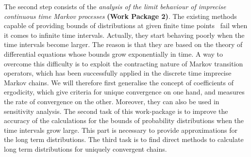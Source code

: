 \documentclass[11pt,dvipsnames,usenames,a4paper]{article}
\begin{document}

The second step consists of the \emph{analysis of the limit behaviour of imprecise continuous time Markov processes} {\bf(Work Package 2)}. The existing methods capable of providing bounds of distributions at given finite time points~\cite{Skulj2015} fail when it comes to infinite time intervals. Actually, they start behaving poorly when the time intervals become larger. The reason is that they are based on the theory of differential equations whose bounds grow exponentially in time. A way to overcome this difficulty is to exploit the contracting nature of Markov transition operators, which has been successfully applied in the discrete time imprecise Markov chains. We will therefore first generalise the concept of coefficients of ergodicity, which give criteria for unique convergence on one hand, and measures the rate of convergence on the other. Moreover, they can also be used in sensitivity analysis. The second task of this work-package is to improve the accuracy of the calculations for the bounds of probability distributions when the time intervals grow large. This part is necessary to provide approximations for the long term distributions. The third task is to find direct methods to calculate long term distributions for uniquely convergent chains. 
\end{document}
